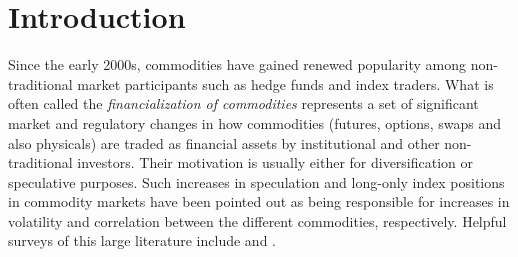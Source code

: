 \documentclass[12pt]{article}
\begin{document}
\section{Introduction} \label{sec:introduction}

Since the early 2000s, commodities have gained renewed popularity among non-traditional market participants such as hedge funds and index traders. What is often called the \emph{financialization of commodities} represents a set of significant market and regulatory changes in how commodities (futures, options, swaps and also physicals) are traded as financial assets by institutional and other non-traditional investors. Their motivation is usually either for diversification or speculative purposes. Such increases in speculation and long-only index positions in commodity markets have been pointed out as being responsible for increases in volatility and correlation between the different commodities, respectively. Helpful surveys of this large literature include \citet{boyd2018update} and \citet{cheng2014financialization}.
\end{document}
